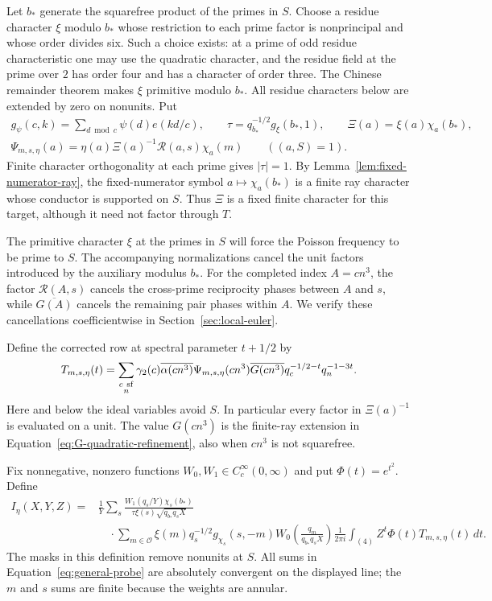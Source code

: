 Let $b_*$ generate the squarefree product of the primes in $S$.
Choose a residue character $\xi$ modulo $b_*$ whose restriction to
each prime factor is nonprincipal and whose order divides six.  Such
a choice exists: at a prime of odd residue characteristic one may
use the quadratic character, and the residue field at the prime over
$2$ has order four and has a character of order three.  The Chinese
remainder theorem makes $\xi$ primitive modulo $b_*$.  All residue
characters below are extended by zero on nonunits.  Put
\[
 \begin{gathered}
 g_\psi(c,k)=\sum_{d\bmod c}\psi(d)e(kd/c),\qquad
 \tau=q_{b_*}^{-1/2}g_\xi(b_*,1),\qquad
 \Xi(a)=\xi(a)\chi_a(b_*),\\
 \Psi_{m,s,\eta}(a)=
       \eta(a)\Xi(a)^{-1}\mathcal R(a,s)\chi_a(m)
       \qquad ((a,S)=1).
 \end{gathered}
\]
Finite character orthogonality at each prime gives $|\tau|=1$.
By Lemma~\ref{lem:fixed-numerator-ray}, the fixed-numerator symbol
$a\mapsto\chi_a(b_*)$ is a finite ray character whose conductor is
supported on $S$.  Thus $\Xi$ is a fixed finite character for this
target, although it need not factor through $T$.

The primitive character $\xi$ at the primes in $S$ will force the
Poisson frequency to be prime to $S$. The accompanying normalizations
cancel the unit factors introduced by the auxiliary modulus $b_*$.
For the completed index $A=cn^3$, the factor $\mathcal R(A,s)$
cancels the cross-prime reciprocity phases between $A$ and $s$, while
$\overline{G(A)}$ cancels the remaining pair phases within $A$.
We verify these cancellations coefficientwise in
Section~\ref{sec:local-euler}.

Define the corrected row at spectral parameter $t+1/2$ by
\[
 T_{m,s,\eta}(t)=
 \sum_{\substack{c\ {\rm sf}\\n}}
 \gamma_2(c)\overline{\alpha(cn^3)}\Psi_{m,s,\eta}(cn^3)
 \overline{G(cn^3)}q_c^{-1/2-t}q_n^{-1-3t}.
\]
Here and below the ideal variables avoid $S$.  In particular every
factor in $\Xi(a)^{-1}$ is evaluated on a unit.  The value
$G(cn^3)$ is the finite-ray extension in
Equation~\eqref{eq:G-quadratic-refinement}, also when $cn^3$ is not
squarefree.

Fix nonnegative, nonzero functions $W_0,W_1\in C_c^\infty(0,\infty)$
and put $\Phi(t)=e^{t^2}$.  Define
\begin{equation}\label{eq:general-probe}
\begin{aligned}
 I_\eta(X,Y,Z)={}&\frac1Y\sum_s
 \frac{W_1(q_s/Y)\chi_s(b_*)}
      {\tau\xi(s)\sqrt{q_{b_*}q_sX}}\\
 &\quad\cdot\sum_{m\in\mathcal O}
       \xi(m)q_s^{-1/2}g_{\chi_s}(s,-m)
       W_0\!\left(\frac{q_m}{q_{b_*}q_sX}\right)
       \frac1{2\pi i}\int_{(4)}
             Z^t\Phi(t)T_{m,s,\eta}(t)\,dt.
\end{aligned}
\end{equation}
The masks in this definition remove nonunits at $S$.  All sums in
Equation~\eqref{eq:general-probe} are absolutely convergent on the
displayed line; the $m$ and $s$ sums are finite because the weights
are annular.

